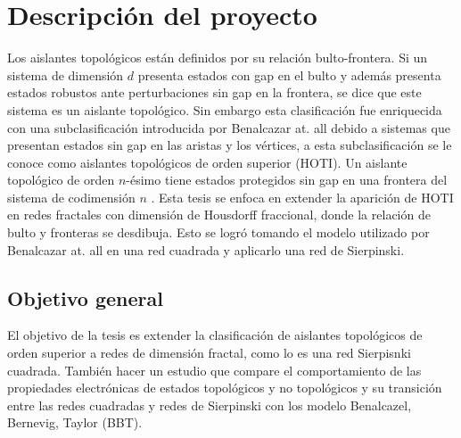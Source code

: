 \chapter{Descripción del proyecto}


Los aislantes topológicos están definidos por su relación bulto-frontera. Si un sistema de dimensión $d$ presenta estados con gap en el bulto y además presenta estados robustos ante perturbaciones sin gap en la frontera, se dice que este sistema es un aislante topológico. Sin embargo esta clasificación fue enriquecida con una subclasificación introducida por Benalcazar at. all \cite{Benalcazar2017} debido a sistemas que presentan estados sin gap en las aristas y los vértices, a esta subclasificación se le conoce como aislantes topológicos de orden superior (HOTI). Un aislante topológico de orden $n$-ésimo tiene estados protegidos sin gap en una frontera del sistema de codimensión $n$ \cite{schindler2018higher}.
Esta tesis se enfoca en extender la aparición de HOTI en redes fractales con dimensión de Housdorff fraccional, donde la relación de bulto y fronteras se desdibuja.  Esto se logró tomando el modelo utilizado por Benalcazar at. all en una red cuadrada y aplicarlo una red de Sierpinski.

    \section{Objetivo general}
    
    El objetivo de la tesis es extender la clasificación de aislantes topológicos de orden superior a redes de dimensión fractal, como lo es una red Sierpisnki cuadrada. También hacer un estudio que compare el comportamiento de las propiedades electrónicas de estados topológicos y no topológicos y su transición entre las redes cuadradas y redes de Sierpinski con los modelo Benalcazel, Bernevig, Taylor (BBT).

